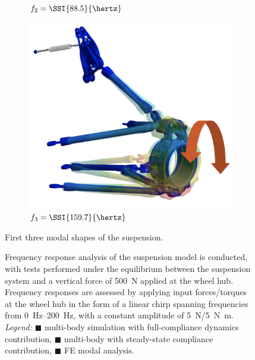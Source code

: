 \begin{figure}[htb]
\begin{subfigure}[c]{0.225\textwidth}
    \caption{$f_2 = \SSI{88.5}{\hertz}$}
  \end{subfigure}
  \begin{subfigure}[c]{0.225\textwidth}
    \centering
    \includegraphics[width=1.0\linewidth]{figures/chapter_5/suspension_mode_3}
    \caption{$f_3 = \SSI{159.7}{\hertz}$}
  \end{subfigure}
  \caption{First three modal shapes of the suspension.}
  \label{chap5:fig:suspension_modes}
\end{figure}

\begin{figure}[htbp]
  \centering
  \small{}
  \caption{Frequency response analysis of the suspension model is conducted, with tests performed under the equilibrium between the suspension system and a vertical force of \SI{500}{\newton} applied at the wheel hub. Frequency responses are assessed by applying input forces/torques at the wheel hub in the form of a linear chirp spanning frequencies from \SIrange{0}{200}{\hertz}, with a constant amplitude of \SI{5}{\newton}/\SI{5}{\newton\meter}. \emph{Legend:} {\color{mycolor1}$\blacksquare$} \Simulink{} multi-body simulation with full-compliance dynamics contribution, {\color{mycolor2}$\blacksquare$} \Simulink{} multi-body with steady-state compliance contribution, {\color{mycolor3}$\blacksquare$} \Ansys{} \ac{FE} modal analysis.}
  \label{chap5:fig:suspension_dynamic_results}
\end{figure}

